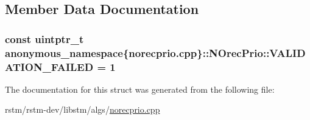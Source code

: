 \subsection{Member Data Documentation}
\hypertarget{structanonymous__namespace_02norecprio_8cpp_03_1_1NOrecPrio_a755ce483e4f10ae87b120a26686320ed}{
\subsubsection[{V\-A\-L\-I\-D\-A\-T\-I\-O\-N\-\_\-\-F\-A\-I\-L\-E\-D}]{\setlength{\rightskip}{0pt plus 5cm}const uintptr\-\_\-t anonymous\-\_\-namespace\{norecprio.\-cpp\}\-::N\-Orec\-Prio\-::\-V\-A\-L\-I\-D\-A\-T\-I\-O\-N\-\_\-\-F\-A\-I\-L\-E\-D = 1\hspace{0.3cm}{\ttfamily [static]}}}\label{structanonymous__namespace_02norecprio_8cpp_03_1_1NOrecPrio_a755ce483e4f10ae87b120a26686320ed}


The documentation for this struct was generated from the following file\-:\begin{DoxyCompactItemize}
\item 
rstm/rstm-\/dev/libstm/algs/\hyperlink{norecprio_8cpp}{norecprio.\-cpp}\end{DoxyCompactItemize}
